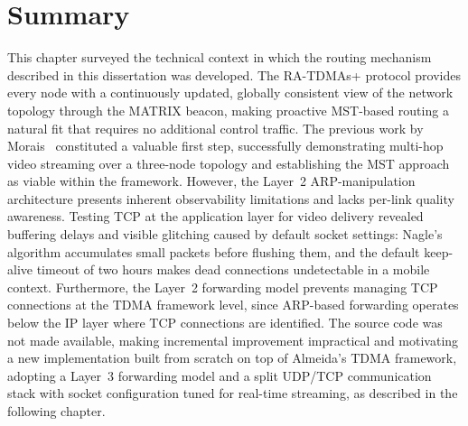 \section{Summary}
\label{sec:background-summary}

This chapter surveyed the technical context in which the routing mechanism described in this
dissertation was developed. The RA-TDMAs+ protocol provides every node with a
continuously updated, globally consistent view of the network topology through the MATRIX
beacon, making proactive MST-based routing a natural fit that requires no additional control
traffic. The previous work by Morais~\cite{morais2024synchronization} constituted a valuable
first step, successfully demonstrating multi-hop video streaming over a three-node topology
and establishing the MST approach as viable within the framework. However, the Layer~2
ARP-manipulation architecture presents inherent observability limitations and lacks
per-link quality awareness. Testing TCP at the application layer for video delivery
revealed buffering delays and visible glitching caused by default socket settings:
Nagle's algorithm accumulates small packets before flushing them, and the default
keep-alive timeout of two hours makes dead connections undetectable in a mobile
context. Furthermore, the Layer~2 forwarding model prevents managing TCP connections
at the TDMA framework level, since ARP-based forwarding operates below the IP layer
where TCP connections are identified. The source code was not made available,
making incremental improvement impractical and motivating a new implementation built
from scratch on top of Almeida's TDMA framework, adopting a Layer~3 forwarding
model and a split UDP/TCP communication stack with socket configuration tuned
for real-time streaming, as described in the following chapter.
